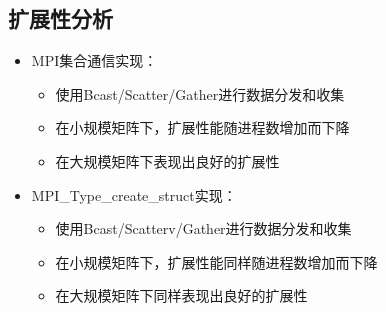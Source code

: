 \documentclass{SYSUReport}
\begin{document}
\subsection{扩展性分析}
\begin{itemize}
    \item MPI集合通信实现：
    \begin{itemize}
        \item 使用Bcast/Scatter/Gather进行数据分发和收集
        \item 在小规模矩阵下，扩展性能随进程数增加而下降
        \item 在大规模矩阵下表现出良好的扩展性
    \end{itemize}
    \item MPI\_Type\_create\_struct实现：
    \begin{itemize}
        \item 使用Bcast/Scatterv/Gather进行数据分发和收集
        \item 在小规模矩阵下，扩展性能同样随进程数增加而下降
        \item 在大规模矩阵下同样表现出良好的扩展性
    \end{itemize}
\end{itemize}
\end{document}
